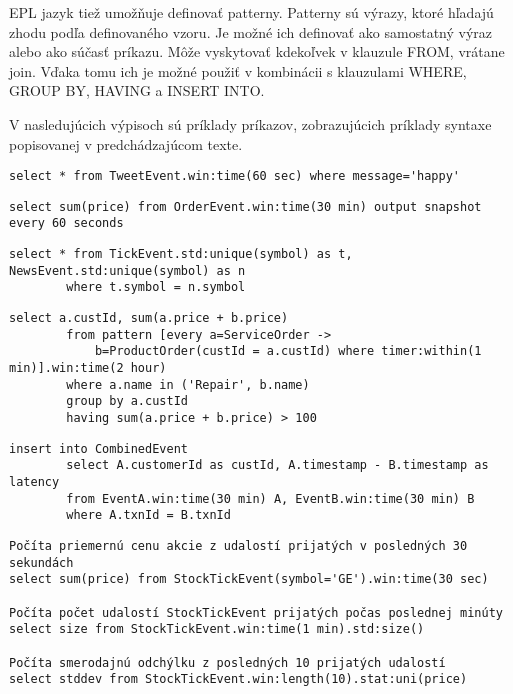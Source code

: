 		EPL jazyk tiež umožňuje definovať patterny. Patterny sú výrazy, ktoré hľadajú zhodu podľa definovaného vzoru. Je možné ich definovať ako samostatný výraz alebo ako súčasť príkazu. Môže vyskytovať kdekoľvek v klauzule FROM, vrátane join. Vďaka tomu ich je možné použiť v kombinácii s klauzulami WHERE, GROUP BY, HAVING a INSERT INTO.
		
		V nasledujúcich výpisoch sú príklady príkazov, zobrazujúcich príklady syntaxe popisovanej v predchádzajúcom texte.
		\begin{lstlisting}[label=lst:epl-simple,caption=Jednoduchý EPL príkaz]
		select * from TweetEvent.win:time(60 sec) where message='happy'
		\end{lstlisting}
		
		\begin{lstlisting}[label=lst:output-example,caption=EPL príkaz s výstupom každých 60 sekúnd]
		select sum(price) from OrderEvent.win:time(30 min) output snapshot every 60 seconds
		\end{lstlisting}

		\begin{lstlisting}[label=lst:epl-join,caption=Jednoduchý EPL príkaz použitím join]
		select * from TickEvent.std:unique(symbol) as t, NewsEvent.std:unique(symbol) as n
		where t.symbol = n.symbol
		\end{lstlisting}

		\begin{lstlisting}[label=lst:epl-pattern,caption=EPL príkaz s použitím patternu]
		select a.custId, sum(a.price + b.price)
		from pattern [every a=ServiceOrder -> 
			b=ProductOrder(custId = a.custId) where timer:within(1 min)].win:time(2 hour) 
		where a.name in ('Repair', b.name)
		group by a.custId
		having sum(a.price + b.price) > 100
		\end{lstlisting}
		
		\begin{lstlisting}[label=lst:insert-into,caption=Príklad použitia klauzuly INSERT INTO]
		insert into CombinedEvent
		select A.customerId as custId, A.timestamp - B.timestamp as latency
		from EventA.win:time(30 min) A, EventB.win:time(30 min) B
		where A.txnId = B.txnId
		\end{lstlisting}
		
		\begin{lstlisting}[label=lst:views,caption=Príklady použitia dátových náhľadov]
Počíta priemernú cenu akcie z udalostí prijatých v posledných 30 sekundách
select sum(price) from StockTickEvent(symbol='GE').win:time(30 sec)

Počíta počet udalostí StockTickEvent prijatých počas poslednej minúty
select size from StockTickEvent.win:time(1 min).std:size()

Počíta smerodajnú odchýlku z posledných 10 prijatých udalostí
select stddev from StockTickEvent.win:length(10).stat:uni(price)
		\end{lstlisting}
		
